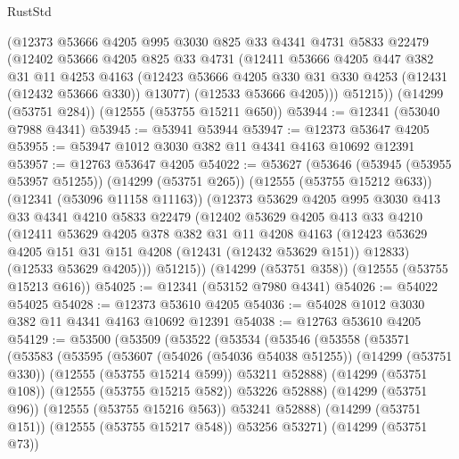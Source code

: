 \begin{lexlean}{RustStd}
\begin{coremodule}
      (@12373
        @53666
        @4205
        @995
        @3030
        @825
        @33
        @4341
        @4731
        @5833
        @22479
        (@12402
          @53666
          @4205
          @825
          @33
          @4731
          (@12411
            @53666
            @4205
            @447
            @382
            @31
            @11
            @4253
            @4163
            (@12423 @53666 @4205 @330 @31 @330 @4253 (@12431 (@12432 @53666 @330)) @13077)
            (@12533 @53666 @4205)))
        @51215))
    (@14299 (@53751 @284))
    (@12555 (@53755 @15211 @650))
@53944 := @12341 (@53040 @7988 @4341)
@53945 := @53941 @53944
@53947 := @12373 @53647 @4205
@53955 := @53947 @1012 @3030 @382 @11 @4341 @4163 @10692 @12391
@53957 := @12763 @53647 @4205
@54022 := @53627
    (@53646
      (@53945 (@53955 @53957 @51255))
      (@14299 (@53751 @265))
      (@12555 (@53755 @15212 @633))
      (@12341 (@53096 @11158 @11163))
      (@12373
        @53629
        @4205
        @995
        @3030
        @413
        @33
        @4341
        @4210
        @5833
        @22479
        (@12402
          @53629
          @4205
          @413
          @33
          @4210
          (@12411
            @53629
            @4205
            @378
            @382
            @31
            @11
            @4208
            @4163
            (@12423 @53629 @4205 @151 @31 @151 @4208 (@12431 (@12432 @53629 @151)) @12833)
            (@12533 @53629 @4205)))
        @51215))
    (@14299 (@53751 @358))
    (@12555 (@53755 @15213 @616))
@54025 := @12341 (@53152 @7980 @4341)
@54026 := @54022 @54025
@54028 := @12373 @53610 @4205
@54036 := @54028 @1012 @3030 @382 @11 @4341 @4163 @10692 @12391
@54038 := @12763 @53610 @4205
@54129 := @53500
    (@53509
      (@53522
        (@53534
          (@53546
            (@53558
              (@53571
                (@53583
                  (@53595
                    (@53607
                      (@54026 (@54036 @54038 @51255))
                      (@14299 (@53751 @330))
                      (@12555 (@53755 @15214 @599))
                      @53211
                      @52888)
                    (@14299 (@53751 @108))
                    (@12555 (@53755 @15215 @582))
                    @53226
                    @52888)
                  (@14299 (@53751 @96))
                  (@12555 (@53755 @15216 @563))
                  @53241
                  @52888)
                (@14299 (@53751 @151))
                (@12555 (@53755 @15217 @548))
                @53256
                @53271)
              (@14299 (@53751 @73))

\end{coremodule}
\end{lexlean}
